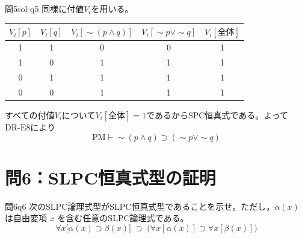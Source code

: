 \documentclass[autodetect-engine,dvi=dvipdfmx,ja=standard]{bxjsarticle}
\begin{document}
\begin{solution}{問5}{sol-q5}
同様に付値\(V_i\)を用いる。
\begin{center}
\begin{tabular}{cc|c|c|c}
\toprule
\(V_i[p]\) & \(V_i[q]\) & \(V_i[\sim(p\land q)]\) & \(V_i[\sim p\lor\sim q]\) & \(V_i[\text{全体}]\) \\
\midrule
1&1&0&0&1\\
1&0&1&1&1\\
0&1&1&1&1\\
0&0&1&1&1\\
\bottomrule
\end{tabular}
\end{center}
すべての付値\(V_i\)について\(V_i[\text{全体}]=1\)であるからSPC恒真式である。よって\(\mathrm{DR\text{-}E8}\)により
\[
  \mathrm{PM}\vdash\sim(p\land q)\supset(\sim p\lor\sim q)
\]
\end{solution}

\section{問6：SLPC恒真式型の証明}

\begin{exercise}{問6}{q6}
次のSLPC論理式型がSLPC恒真式型であることを示せ。ただし，\(\alpha(x)\) は自由変項 \(x\) を含む任意のSLPC論理式である。
\[
  \forall x\bigl[\alpha(x)\supset\beta(x)\bigr]
  \;\supset\;
  \bigl(\forall x[\alpha(x)]\supset\forall x[\beta(x)]\bigr)
\]
\end{exercise}
\end{document}
